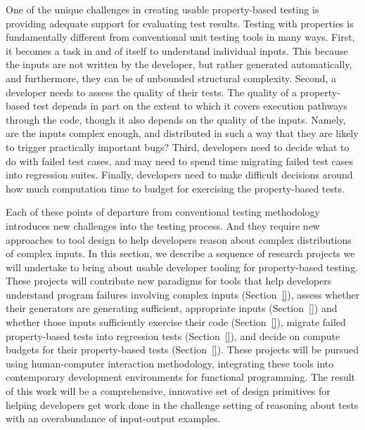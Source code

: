 
One of the unique challenges in creating usable property-based testing is
providing adequate support for evaluating test results. Testing with properties
is fundamentally different from conventional unit testing tools in many ways.
First, it becomes a task in and of itself to understand individual inputs. This
because the inputs are not written by the developer, but rather generated
automatically, and furthermore, they can be of unbounded structural complexity.
Second, a developer needs to assess the quality of their tests. The quality of a
property-based test depends in part on the extent to which it covers execution
pathways through the code, though it also depends on the quality of the inputs.
Namely, are the inputs complex enough, and distributed in such a way that they
are likely to trigger practically important bugs? Third, developers need to
decide what to do with failed test cases, and may need to spend time migrating
failed test cases into regression suites. Finally, developers need to make
difficult decisions around how much computation time to budget for exercising
the property-based tests.

Each of these points of departure from conventional testing methodology
introduces new challenges into the testing process. And they require new
approaches to tool design to help developers reason about complex distributions
of complex inputs. In this section, we describe a sequence of research projects
we will undertake to bring about usable developer tooling for property-based
testing. These projects will contribute new paradigms for tools that help
developers understand program failures involving complex inputs
(Section~\ref{}), assess whether their generators are generating sufficient,
appropriate inputs (Section~\ref{}) and whether those inputs sufficiently
exercise their code (Section~\ref{}), migrate failed property-based tests into
regression tests (Section~\ref{}), and decide on compute budgets for their
property-based tests (Section~\ref{}). These projects will be pursued using
human-computer interaction methodology, integrating these tools into
contemporary development environments for functional programming. The result of
this work will be a comprehensive, innovative set of design primitives for
helping developers get work done in the challenge setting of reasoning about
tests with an overabundance of input-output examples.



